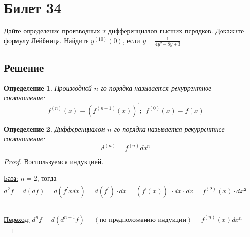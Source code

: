 \documentclass[a4paper,12pt]{article}
\newtheorem*{defi}{Определение}
\newcommand{\drv}{^{\prime}}
\begin{document}
    \section*{Билет 34}

    Дайте определение производных и дифференциалов высших порядков. Докажите
    формулу Лейбница. Найдите $y^{(10)}(0)$, если $y=\frac{1}{4y^2-8y+3}$

    \subsection*{Решение}
    \begin{defi}
        Производной $n$-го порядка называется рекуррентное соотношение:
            $$
            f^{(n)}(x) = (f^{(n-1)}(x))\drv; \,\,\,
            f^{(0)}(x) = f(x)
            $$
    \end{defi}

    \begin{defi}
        Дифференциалом $n$-го порядка называется рекуррентное соотношение:
        $$
            d^{(n)} = f^{(n)}dx^{n}
        $$
    \end{defi}
    \begin{proof}
        Воспользуемся индукцией.

        \par\underline{База:} $n=2$, тогда $d^2f = d(df) =
        d(f\drv x dx) = d(f\drv)\cdot dx = (f\drv(x))\drv\cdot dx\cdot dx =
        f^{(2)}(x)\cdot dx^2$.

        \par\underline{Переход:}
        $d^{n}f = d(d^{n-1}f) = (\text{по предположению индукции}) =
        f^{(n)}(x)dx^n$
    \end{proof}
\end{document}
